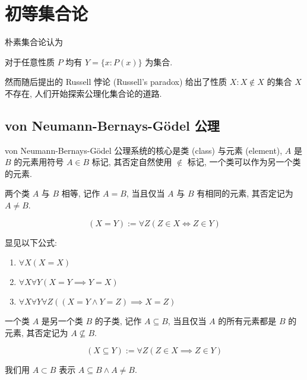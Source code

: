 \section{初等集合论}

朴素集合论认为

\begin{axiom}
    对于任意性质 \(P\) 均有 \(Y = \{x : P(x)\}\) 为集合.
\end{axiom}

然而随后提出的 Russell 悖论 (Russell's paradox) 给出了性质 \(X: X \notin X\) 的集合 \(X\) 不存在, 人们开始探索公理化集合论的道路. 

\subsection{von Neumann-Bernays-Gödel 公理}

von Neumann-Bernays-Gödel 公理系统的核心是类 (class) 与元素 (element), \(A\) 是 \(B\) 的元素用符号 \(A \in B\) 标记,
其否定自然使用 \(\notin\) 标记, 一个类可以作为另一个类的元素.

\begin{definition}
    两个类 \(A\) 与 \(B\) 相等, 记作 \(A = B\), 当且仅当 \(A\) 与 \(B\) 有相同的元素, 其否定记为 \(A \neq B\).

    \[
        (X = Y) := \forall Z (Z \in X \iff Z \in Y)
    \]
\end{definition}

\begin{corollary}
    显见以下公式:

    \begin{enumerate}
        \item \(\forall X (X = X)\)
        \item \(\forall X \forall Y (X = Y \implies Y = X)\)
        \item \(\forall X \forall Y \forall Z ((X = Y \land Y = Z) \implies X = Z)\)
    \end{enumerate}
\end{corollary}

\begin{definition}
    一个类 \(A\) 是另一个类 \(B\) 的子类, 记作 \(A \subseteq B\), 当且仅当 \(A\) 的所有元素都是 \(B\) 的元素, 其否定记为 \(A \nsubseteq B\).

    \[
        (X \subseteq Y) := \forall Z (Z \in X \implies Z \in Y)
    \]

    我们用 \(A \subset B\) 表示 \(A \subseteq B \land A \neq B\).
\end{definition}

